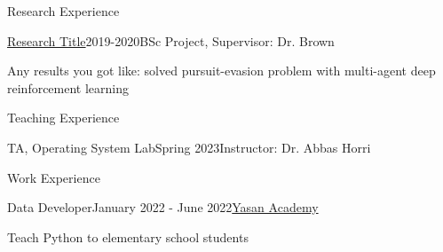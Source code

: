 \documentclass{resume} %
\begin{document}
    \begin{rSection}{Research Experience}
        \begin{rSubsection}{\href{https://link_to_your_research.com}{\textcolor{coolblack}{Research Title}}}{2019-2020}{BSc Project, Supervisor: Dr. Brown}{ }
            \item Any results you got like: solved pursuit-evasion problem with multi-agent deep reinforcement learning
        \end{rSubsection}
    \end{rSection}

    \begin{rSection}{Teaching Experience}
        \begin{rSubsection}{TA, Operating System Lab}{Spring 2023}{Instructor: Dr. Abbas Horri}{ }
        \end{rSubsection}
    \end{rSection}

    \begin{rSection}{Work Experience}
        \begin{rSubsection}{Data Developer}{January 2022 - June 2022}{\href{https://yasanacademy.ir}{\textcolor{coolblack}{Yasan Academy}}}{ }
            \item Teach Python to elementary school students
        \end{rSubsection}
    \end{rSection}
\end{document}
